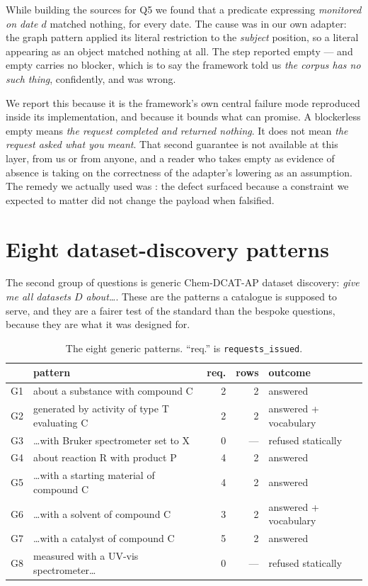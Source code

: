 \documentclass[11pt,a4paper]{article}
\theoremstyle{plain}
\theoremstyle{definition}
\theoremstyle{remark}
\newcommand{\vans}{\textsf{answered}}
\newcommand{\vempty}{\textsf{empty}}
\begin{document}
While building the sources for Q5 we found that a predicate expressing
\emph{monitored on date $d$} matched nothing, for every date. The cause
was in our own adapter: the graph pattern applied its literal
restriction to the \emph{subject} position, so a literal appearing as
an object matched nothing at all. The step reported \vempty{} --- and
\vempty{} carries no blocker, which is to say the framework told us
\emph{the corpus has no such thing}, confidently, and was wrong.

We report this because it is the framework's own central failure mode
reproduced inside its implementation, and because it bounds what
 can promise. A blockerless \vempty{} means
\emph{the request completed and returned nothing}. It does not mean
\emph{the request asked what you meant}. That second guarantee is not
available at this layer, from us or from anyone, and a reader who takes
\vempty{} as evidence of absence is taking on the correctness of the
adapter's lowering as an assumption. The remedy we actually used was
: the defect surfaced because a constraint we
expected to matter did not change the payload when falsified.

\section{Eight dataset-discovery patterns}
\label{sec:generic}

The second group of questions is generic Chem-DCAT-AP dataset
discovery: \emph{give me all datasets $D$ about\ldots}. These are the
patterns a catalogue is supposed to serve, and they are a fairer test
of the standard than the bespoke questions, because they are what it
was designed for.

\begin{table}[H]\centering\small
\begin{tabular}{llrrl}
\toprule
 & pattern & req. & rows & outcome \\
\midrule
G1 & about a substance with compound C            & 2 & 2 & \vans \\
G2 & generated by activity of type T evaluating C & 2 & 2 & \vans{} + \textsf{vocabulary} \\
G3 & \ldots with Bruker spectrometer set to X     & 0 & --- & refused statically \\
G4 & about reaction R with product P              & 4 & 2 & \vans \\
G5 & \ldots with a starting material of compound C& 4 & 2 & \vans \\
G6 & \ldots with a solvent of compound C          & 3 & 2 & \vans{} + \textsf{vocabulary} \\
G7 & \ldots with a catalyst of compound C         & 5 & 2 & \vans \\
G8 & measured with a UV-vis spectrometer\ldots    & 0 & --- & refused statically \\
\bottomrule
\end{tabular}
\caption{The eight generic patterns. ``req.'' is
\texttt{requests\_issued}.}
\label{tab:generic}
\end{table}
\end{document}
